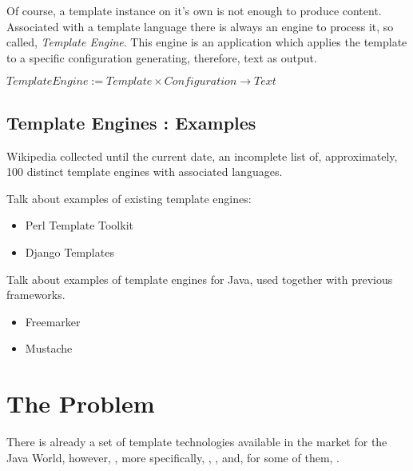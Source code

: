 Of course, a template instance on it's own is not enough to produce content. Associated with a template language there is always an engine to process it, so called, \textit{Template Engine}. This engine is an application which applies the template to a specific configuration generating, therefore, text as output.

\begin{center}
    $TemplateEngine := Template \times Configuration \rightarrow Text$
\end{center}

\subsection{Template Engines : Examples}

Wikipedia collected \cite{WikipediaComparisonEngines} until the current date, an incomplete list of, approximately, 100 distinct template engines with associated languages.

\begin{expand}
    Talk about examples of existing template engines:
    
    \begin{itemize}
        \item Perl Template Toolkit \cite{Chamberlain2003PerlToolkit}
        \item Django Templates \cite{Newman2008DjangoMore} 
    \end{itemize}
\end{expand}

\begin{expand}
    Talk about examples of template engines for Java, used together with previous frameworks.
    \begin{itemize}
        \item Freemarker \cite{Forsythe2013InstantFreemarker}
        \item Mustache
        \cite{Forsythe2013InstantFreemarker}
    \end{itemize}
\end{expand}

\section{The Problem}

There is already a set of template technologies available in the market for the Java World, however, , more specifically, , ,  and, for some of them, . 

